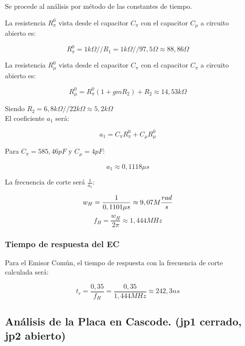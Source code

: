 \documentclass[letterpaper, 10 pt, conference]{ieeeconf}  %
\begin{document}
Se procede al análisis por método de las constantes de tiempo.

La resistencia $R_{\pi}^0$ vista desde el capacitor $C_\pi$ con el capacitor $C_\mu$ a circuito abierto es:

\begin{equation}
    R_{\pi}^0 = 1k\Omega // R_1 = 1k\Omega // 97,5\Omega \approx 88,86\Omega
\end{equation}

La resistencia $R_{\mu}^0$ vista desde el capacitor $C_\pi$ con el capacitor $C_\pi$ a circuito abierto es:

\begin{equation}
    R_{\mu}^0 = R_{\pi}^0(1 + gmR_2) + R_2 \approx 14,53 k\Omega
\end{equation}

Siendo $R_2 = 6,8k\Omega // 22k\Omega \approx 5,2k\Omega$ \\

El coeficiente $a_1$ será:

\begin{equation}
    a_1 = C_\pi R_{\pi}^0 + C_\mu  R_{\mu}^0 
\end{equation}

Para $ C_\pi = 585,46pF$ y $C_\mu = 4pF$:

\begin{equation}
    a_1 \approx 0,1118\mu s
\end{equation}

La frecuencia de corte será $\frac{1}{a_1}$:

\begin{equation}
    w_H = \frac{1}{0,1101\mu s} \approx 9,07M \frac{rad}{s}\\
\end{equation}
\begin{equation}
    f_H = \frac{w_H}{2\pi} \approx 1,444MHz
\end{equation}

\subsubsection{Tiempo de respuesta del EC}
Para el Emisor Común, el tiempo de respuesta con la frecuencia de corte calculada será:

\begin{equation}
    t_r = \frac{0,35}{f_H} = \frac{0,35}{1,444MHz} \approx 242,3ns
\end{equation}

\subsection{\textbf{Análisis de la Placa en Cascode. (jp1 cerrado, jp2 abierto)}}
\end{document}
